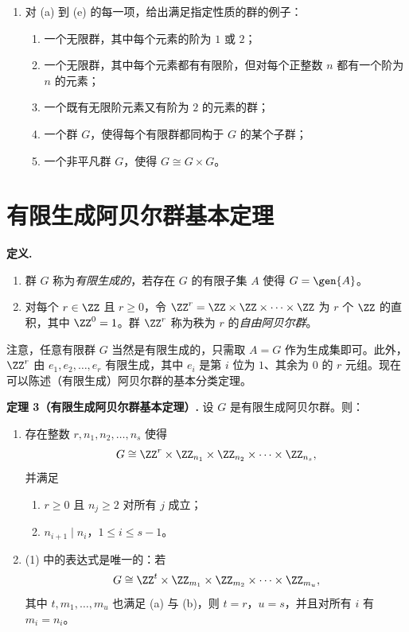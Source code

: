 \begin{enumerate}[label=\arabic*.]
  \item 对 (a) 到 (e) 的每一项，给出满足指定性质的群的例子：
  \begin{enumerate}[label=(\alph*)]
    \item 一个无限群，其中每个元素的阶为 $1$ 或 $2$；
    \item 一个无限群，其中每个元素都有有限阶，但对每个正整数 $n$ 都有一个阶为 $n$ 的元素；
    \item 一个既有无限阶元素又有阶为 $2$ 的元素的群；
    \item 一个群 $G$，使得每个有限群都同构于 $G$ 的某个子群；
    \item 一个非平凡群 $G$，使得 $G\cong G\times G$。
  \end{enumerate}
\end{enumerate}

\section{有限生成阿贝尔群基本定理}

\noindent\textbf{定义.}
\begin{enumerate}[label=(\arabic*)]
  \item 群 $G$ 称为\emph{有限生成的}，若存在 $G$ 的有限子集 $A$ 使得 $G=\gen{A}$。
  \item 对每个 $r\in\ZZ$ 且 $r\geq 0$，令 $\ZZ^r=\ZZ\times\ZZ\times\cdots\times\ZZ$ 为 $r$ 个 $\ZZ$ 的直积，其中 $\ZZ^0=1$。群 $\ZZ^r$ 称为秩为 $r$ 的\emph{自由阿贝尔群}。
\end{enumerate}

注意，任意有限群 $G$ 当然是有限生成的，只需取 $A=G$ 作为生成集即可。此外，$\ZZ^r$ 由 $e_1,e_2,\ldots,e_r$ 有限生成，其中 $e_i$ 是第 $i$ 位为 $1$、其余为 $0$ 的 $r$ 元组。现在可以陈述（有限生成）阿贝尔群的基本分类定理。

\medskip
\noindent\textbf{定理 3（有限生成阿贝尔群基本定理）.} 设 $G$ 是有限生成阿贝尔群。则：
\begin{enumerate}[label=(\arabic*)]
  \item 存在整数 $r,n_1,n_2,\ldots,n_s$ 使得
  \[
    G\cong \ZZ^r\times \ZZ_{n_1}\times\ZZ_{n_2}\times\cdots\times\ZZ_{n_s},
  \]
  并满足
  \begin{enumerate}[label=(\alph*)]
    \item $r\geq 0$ 且 $n_j\geq 2$ 对所有 $j$ 成立；
    \item $n_{i+1}\mid n_i$，$1\leq i\leq s-1$。
  \end{enumerate}

  \item (1) 中的表达式是唯一的：若
  \[
    G\cong \ZZ^t\times \ZZ_{m_1}\times\ZZ_{m_2}\times\cdots\times\ZZ_{m_u},
  \]
  其中 $t,m_1,
\ldots,m_u$ 也满足 (a) 与 (b)，则 $t=r$，$u=s$，并且对所有 $i$ 有 $m_i=n_i$。
\end{enumerate}

